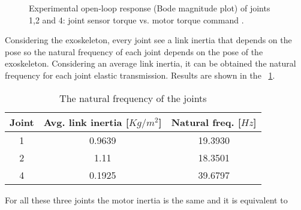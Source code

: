 \begin{figure}[ht]
	\centering
\DIFdelbeginFL %
\DIFdelendFL %
	\DIFaddbeginFL \def\svgwidth{1\columnwidth}
	\begin{footnotesize}
		
	\end{footnotesize}
	\DIFaddendFL \caption{Experimental open-loop response (Bode magnitude plot) of joints 1,2 and 4: joint sensor torque vs. motor torque command \DIFaddbeginFL {}\DIFaddendFL .}
	\label{fig:OpenLoopJointBode}
\end{figure}
Considering the exoskeleton, every joint see a link inertia that depends on the pose so the natural frequency of each joint depends on the pose of the exoskeleton. 
Considering an average link inertia, it can be obtained the natural frequency for each joint elastic transmission. Results are shown in the \tablename \ \ref{tab:naturalFrequencies}.
\begin{table}[!t]
	\renewcommand{\arraystretch}{1.3}
	\caption{The natural frequency of the joints}
	\label{tab:naturalFrequencies}
	\centering
	\begin{tabular}{c c c}
		\hline \hline
		\bfseries Joint & \bfseries Avg. link inertia [$Kg/m^2$] & \bfseries Natural freq. [$Hz$]\\
		\hline
		1 & 0.9639 & 19.3930\\
		2 & 1.11 & 18.3501\\
		4 & 0.1925 & 39.6797\\
		\hline \hline
	\end{tabular}
\end{table}
For all these three joints the motor inertia is the same and it is equivalent to \DIFdelbegin {}\DIFdelend \DIFaddbegin {}\DIFaddend 


